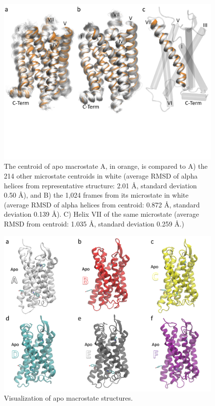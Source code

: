 \begin{figure}[htbp]
\begin{center}
\includegraphics[width=\textwidth]{./figures/centroid-micromacrostates.png}
\caption[Quantifying the representativeness of microstate and macrostate centroid definitions]{The centroid of apo macrostate A, in orange, is compared to A) the 214 other microstate centroids in white (average RMSD of alpha helices from representative structure: 2.01 {\AA}, standard deviation 0.50 {\AA}), and B) the 1,024 frames from its microstate in white (average RMSD of alpha helices from centroid: 0.872 {\AA}, standard deviation 0.139 {\AA}). C) Helix VII of the same microstate (average RMSD from centroid: 1.035 {\AA}, standard deviation 0.259 {\AA}.)}
\label{fig:centroid-helixVII}
\end{center}
\end{figure}

\begin{figure}[htbp]
\begin{center}
\includegraphics[width=\textwidth]{./figures/apo-centroids.png}
\caption{Visualization of apo macrostate structures.}
\label{fig:apo-centroids}
\end{center}
\end{figure}

